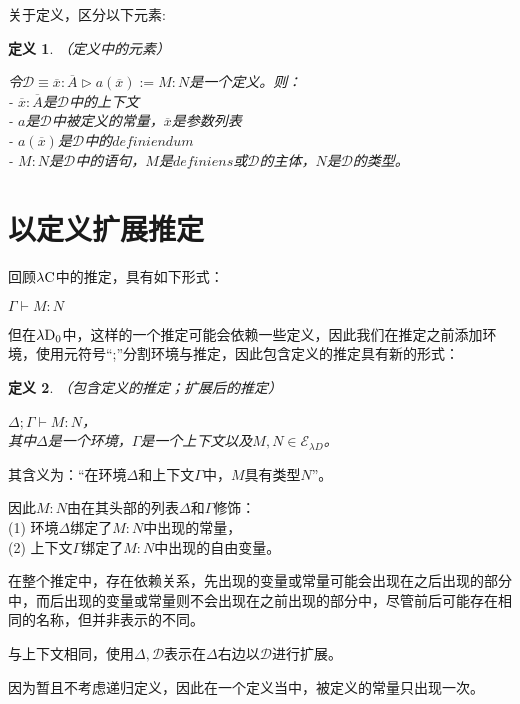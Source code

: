 \documentclass[UTF8]{article}
\newtheorem{thm}{定义}[section]
\begin{document}
		关于定义，区分以下元素:
		
		\begin{thm}（定义中的元素）
			
			\noindent
			令$\mathcal{D}\equiv\overline{x}:\overline{A}\triangleright a(\overline{x}):=M:N$是一个定义。则：\\
			- $\overline{x}:\overline{A}$是$\mathcal{D}$中的上下文\\
			- $a$是$\mathcal{D}$中被定义的常量，$\overline{x}$是参数列表\\
			- $a(\overline{x})$是$\mathcal{D}$中的$definiendum$\\
			- $M:N$是$\mathcal{D}$中的语句，$M$是$definiens$或$\mathcal{D}$的主体，$N$是$\mathcal{D}$的类型。
		\end{thm}

	\section{以定义扩展推定}
	\noindent
	回顾$\lambda{\rm C}$中的推定，具有如下形式：
	
		$\Gamma\vdash M:N$
		
		但在$\lambda{\rm D_0}$中，这样的一个推定可能会依赖一些定义，因此我们在推定之前添加环境，使用元符号“;”分割环境与推定，因此包含定义的推定具有新的形式：
		
		\begin{thm}（包含定义的推定；扩展后的推定）
			
			$\Delta;\Gamma\vdash M:N$，\\
			其中$\Delta$是一个环境，$\Gamma$是一个上下文以及$M,N\in\mathcal{E}_{\lambda{D}}$。
		\end{thm}
	
		其含义为：“在环境$\Delta$和上下文$\Gamma$中，$M$具有类型$N$”。
		
		因此$M:N$由在其头部的列表$\Delta$和$\Gamma$修饰：\\
		(1) 环境$\Delta$绑定了$M:N$中出现的常量，\\
		(2) 上下文$\Gamma$绑定了$M:N$中出现的自由变量。
		
		在整个推定中，存在依赖关系，先出现的变量或常量可能会出现在之后出现的部分中，而后出现的变量或常量则不会出现在之前出现的部分中，尽管前后可能存在相同的名称，但并非表示的不同。
		
		与上下文相同，使用$\Delta,\mathcal{D}$表示在$\Delta$右边以$\mathcal{D}$进行扩展。
		
		因为暂且不考虑递归定义，因此在一个定义当中，被定义的常量只出现一次。
		
\end{document}
